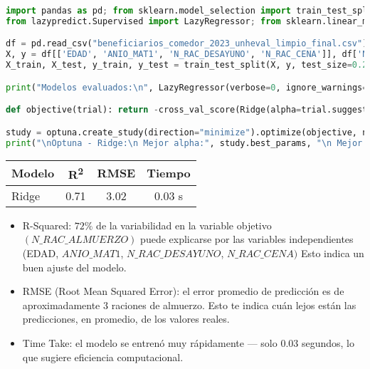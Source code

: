 \documentclass{article}
\begin{document}
\begin{lstlisting}[language=Python, caption={Uso del Optuna junto con el modelo Ridge}]
import pandas as pd; from sklearn.model_selection import train_test_split, KFold, cross_val_score
from lazypredict.Supervised import LazyRegressor; from sklearn.linear_model import Ridge; import optuna

df = pd.read_csv("beneficiarios_comedor_2023_unheval_limpio_final.csv").query('N_RAC_ALMUERZO > 0')
X, y = df[['EDAD', 'ANIO_MAT1', 'N_RAC_DESAYUNO', 'N_RAC_CENA']], df['N_RAC_ALMUERZO']
X_train, X_test, y_train, y_test = train_test_split(X, y, test_size=0.2, random_state=42)

print("Modelos evaluados:\n", LazyRegressor(verbose=0, ignore_warnings=True).fit(X_train, X_test, y_train, y_test)[0])

def objective(trial): return -cross_val_score(Ridge(alpha=trial.suggest_float('alpha', 1e-4, 100.0, log=True)), X, y, cv=KFold(5, shuffle=True, random_state=42), scoring='neg_root_mean_squared_error').mean()

study = optuna.create_study(direction="minimize").optimize(objective, n_trials=30)
print("\nOptuna - Ridge:\n Mejor alpha:", study.best_params, "\n Mejor RMSE:", study.best_value)

\end{lstlisting}
\begin{tcolorbox}[colback=gray!5, colframe=black, title=Datos obtenidos del modelo Ridge]
\begin{tabular}{lccc}
\toprule
\textbf{Modelo} & \textbf{R\textsuperscript{2}} & \textbf{RMSE} & \textbf{Tiempo} \\
\midrule
Ridge & 0.71 & 3.02 & 0.03 s \\
\bottomrule
\end{tabular}
\end{tcolorbox}

\begin{itemize}
    \item R-Squared:  $72\%$ de la variabilidad en la variable objetivo $(N\_RAC\_ALMUERZO)$ puede explicarse por las variables independientes (EDAD, $ANIO\_MAT1$, $N\_RAC\_DESAYUNO$, $N\_RAC\_CENA)$ Esto indica un buen ajuste del modelo.
    \item RMSE (Root Mean Squared Error): el error promedio de predicción es de aproximadamente 3 raciones de almuerzo. Esto te indica cuán lejos están las predicciones, en promedio, de los valores reales.
    \item Time Take: el modelo se entrenó muy rápidamente — solo 0.03 segundos, lo que sugiere eficiencia computacional.
\end{itemize}
\end{document}

